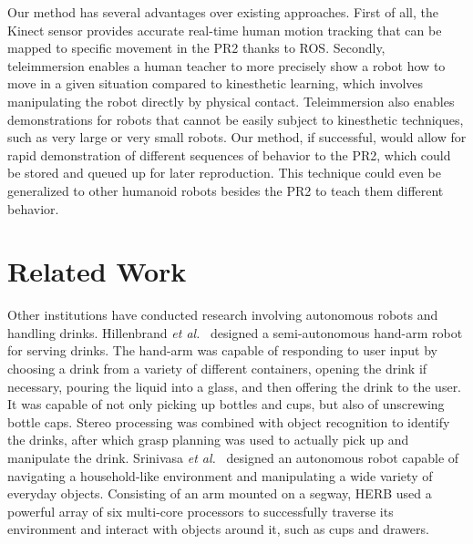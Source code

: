 \documentclass{sig-alternate}
\begin{document}
Our method has several advantages over existing approaches. First of all, the Kinect sensor provides accurate real-time human motion tracking that can be mapped to specific movement in the PR2 thanks to ROS. Secondly, teleimmersion enables a human teacher to more precisely show a robot how to move in a given situation compared to kinesthetic learning, which involves manipulating the robot directly by physical contact. Teleimmersion also enables demonstrations for robots that cannot be easily subject to kinesthetic techniques, such as very large or very small robots. Our method, if successful, would allow for rapid demonstration of different sequences of behavior to the PR2, which could be stored and queued up for later reproduction. This technique could even be generalized to other humanoid robots besides the PR2 to teach them different behavior.\\
	
\section{Related Work}
\label{sec:related_work}
Other institutions have conducted research involving autonomous robots and handling drinks. Hillenbrand \textit{et al.}~\cite{pouring_arm} designed a semi-autonomous hand-arm robot for serving drinks. The hand-arm was capable of responding to user input by choosing a drink from a variety of different containers, opening the drink if necessary, pouring the liquid into a glass, and then offering the drink to the user. It was capable of not only picking up bottles and cups, but also of unscrewing bottle caps. Stereo processing was combined with object recognition to identify the drinks, after which grasp planning was used to actually pick up and manipulate the drink. Srinivasa \textit{et al.}~\cite{herb} designed an autonomous robot capable of navigating a household-like environment and manipulating a wide variety of everyday objects. Consisting of an arm mounted on a segway, HERB used a powerful array of six multi-core processors to successfully traverse its environment and interact with objects around it, such as cups and drawers.\\
\end{document}
